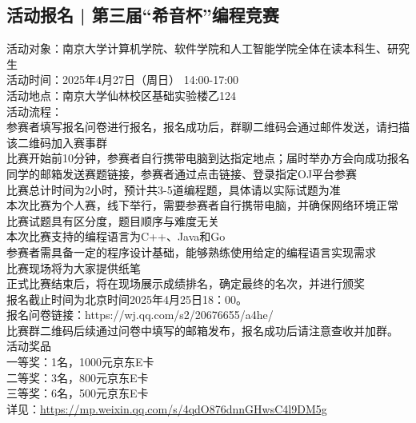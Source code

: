 \documentclass[letterpaper, 12pt]{article}
\begin{document}
\begin{multicols}{2}
\subsection{活动报名 | 第三届“希音杯”编程竞赛} %
活动对象：南京大学计算机学院、软件学院和人工智能学院全体在读本科生、研究生
\\活动时间：2025年4月27日（周日） 14:00-17:00
\\活动地点：南京大学仙林校区基础实验楼乙124
\\活动流程：
\\参赛者填写报名问卷进行报名，报名成功后，群聊二维码会通过邮件发送，请扫描该二维码加入赛事群
\\比赛开始前10分钟，参赛者自行携带电脑到达指定地点；届时举办方会向成功报名同学的邮箱发送赛题链接，参赛者通过点击链接、登录指定OJ平台参赛
\\比赛总计时间为2小时，预计共3-5道编程题，具体请以实际试题为准
\\本次比赛为个人赛，线下举行，需要参赛者自行携带电脑，并确保网络环境正常
\\比赛试题具有区分度，题目顺序与难度无关
\\本次比赛支持的编程语言为C++、Java和Go
\\参赛者需具备一定的程序设计基础，能够熟练使用给定的编程语言实现需求
\\比赛现场将为大家提供纸笔
\\正式比赛结束后，将在现场展示成绩排名，确定最终的名次，并进行颁奖
\\报名截止时间为北京时间2025年4月25日18：00。
\\报名问卷链接：https://wj.qq.com/s2/20676655/a4he/
\\比赛群二维码后续通过问卷中填写的邮箱发布，报名成功后请注意查收并加群。
\\活动奖品
\\一等奖：1名，1000元京东E卡
\\二等奖：3名，800元京东E卡
\\三等奖：6名，500元京东E卡
\\详见：\url{https://mp.weixin.qq.com/s/4qdO876dnnGHwsC4l9DM5g}


\end{multicols}
\end{document}
